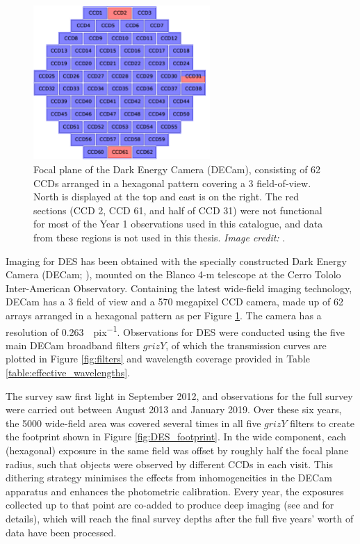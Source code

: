 \begin{figure}[htbp] 
\centering    
\includegraphics[width=0.6\textwidth]{DECAM_CCD.jpg}
\caption[DECam focal plane]{Focal plane of the Dark Energy Camera (DECam), consisting of 62 CCDs arranged in a hexagonal pattern covering a \SI{3}{\sqdeg} field-of-view. North is displayed at the top and east is on the right. The red sections (CCD 2, CCD 61, and half of CCD 31) were not functional for most of the Year 1 observations used in this catalogue, and data from these regions is not used in this thesis. \textit{Image credit:} \cite{2018ApJS..239...18A}.}
\label{fig:DECAM}
\end{figure} 


Imaging for DES has been obtained with the specially constructed Dark Energy Camera (DECam; \citealt{2015AJ....150..150F}), mounted on the Blanco 4-m telescope at the Cerro Tololo Inter-American Observatory. Containing the latest wide-field imaging technology, DECam has a \SI{3}{\sqdeg} field of view and a 570 megapixel CCD camera, made up of 62 arrays arranged in a hexagonal pattern as per Figure \ref{fig:DECAM}. The camera has a resolution of \SI{0.263}{\arcsec.pix^{-1}}. Observations for DES were conducted using the five main DECam broadband filters $grizY$, of which the transmission curves are plotted in Figure \ref{fig:filters} and wavelength coverage provided in Table \ref{table:effective_wavelengths}. \par



The survey saw first light in September 2012, and observations for the full survey were carried out between August 2013 and January 2019. Over these six years, the \SI{5000}{\sqdeg} wide-field area was covered several times in all five $grizY$ filters to create the footprint shown in Figure \ref{fig:DES_footprint}. In the wide component, each (hexagonal) exposure in the same field was offset by roughly half the focal plane radius, such that objects were observed by different CCDs in each visit. This dithering strategy minimises the effects from inhomogeneities in the DECam apparatus and enhances the photometric calibration. Every year, the exposures collected up to that point are co-added to produce deep imaging (see \citealt{2018ApJS..239...18A} and \citealt{2018PASP..130g4501M} for details), which will reach the final survey depths after the full five years' worth of data have been processed. \par 



